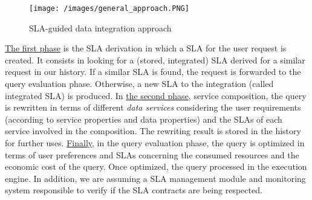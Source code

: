 


\begin{figure}[h!]
\center
\texttt{[image: /images/general\_approach.PNG]} 
\caption{SLA-guided data integration approach}\label{approach}
\end{figure}

\underline{The first phase} is the SLA derivation in which a SLA for the user request is created. It consists in looking for a (stored, integrated) SLA derived for a similar request in our history. If a similar SLA is found, the request is forwarded to the query evaluation phase. Otherwise, a new SLA to the integration (called integrated SLA) is produced. 
In \underline{the second phase}, service composition, the query is rewritten in terms of different \textsl{data services} considering the user requirements (according to service properties and data properties) and the SLAs of each service involved in the composition. The rewriting result is stored in the history for further uses. \underline{Finally}, in the query evaluation phase, the query is optimized in terms of user preferences and SLAs concerning the consumed resources and the economic cost of the query. Once optimized, the query processed in the execution engine. In addition, we are assuming a SLA management module and monitoring system responsible to verify if the SLA contracts are being respected. 

